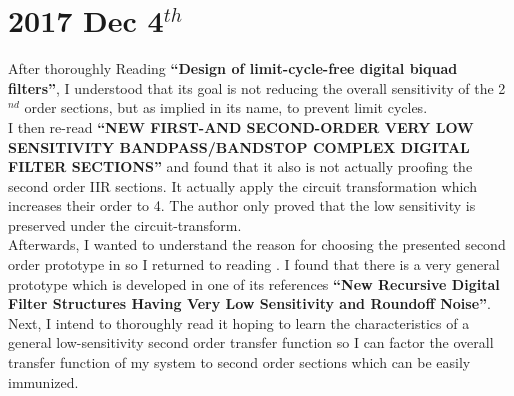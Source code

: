 \documentclass[12pt]{article}
\begin{document}
\section{2017 Dec 4$^{th}$}
After thoroughly Reading \textbf{``Design of limit-cycle-free digital biquad filters''}\cite{Nishihara1986DesignFilters}, I understood that its goal is not reducing the overall sensitivity of the 2$^{nd}$ order sections, but as implied in its name, to prevent limit cycles.
\\
I then re-read \textbf{``NEW FIRST-AND SECOND-ORDER VERY LOW SENSITIVITY BANDPASS/BANDSTOP COMPLEX DIGITAL FILTER SECTIONS''}\cite{StoyanovNEWSECTIONS} and found that it also is not actually proofing the second order IIR sections. It actually apply the circuit transformation which increases their order to 4. The author only proved that the low sensitivity is preserved under the circuit-transform.
\\
Afterwards, I wanted to understand the reason for choosing the presented second order prototype in \cite{StoyanovNEWSECTIONS} so I returned to reading \cite{Nishihara1986DesignFilters}. I found that there is a very general prototype which is developed in one of its references \textbf{``New Recursive Digital Filter Structures Having Very Low Sensitivity and Roundoff Noise''}\cite{Agarwal1975NewNoise}. Next, I intend to thoroughly read it hoping to learn the characteristics of a general low-sensitivity second order transfer function so I can factor the overall transfer function of my system to second order sections which can be easily immunized.
\end{document}
